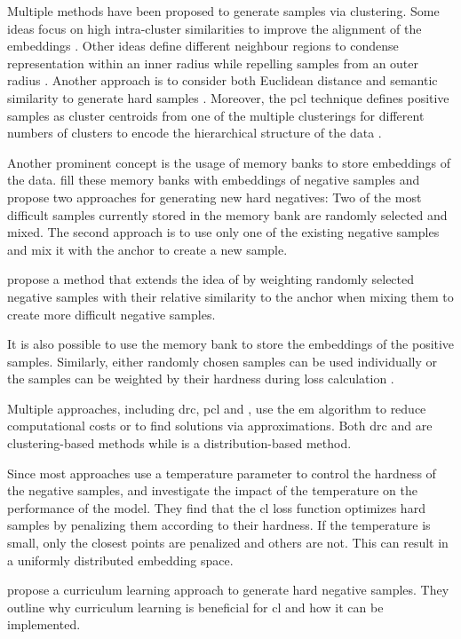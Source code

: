 Multiple methods have been proposed to generate samples via clustering.
Some ideas focus on high intra-cluster similarities to improve the alignment of the embeddings \citet{DRC_2020}.
Other ideas define different neighbour regions to condense representation within an inner radius 
while repelling samples from an outer radius \citet{local_aggr_2019}.
Another approach is to consider both Euclidean distance and semantic similarity to generate hard samples \citet{mining_manifolds_2018}.
Moreover, the \ac{pcl} technique defines positive samples as cluster centroids 
from one of the multiple clusterings for different numbers of clusters 
to encode the hierarchical structure of the data \citet{PCL_2021}.


Another prominent concept is the usage of memory banks to store embeddings of the data.
\citeauthor{mochi_2020} fill these memory banks with embeddings of negative samples 
and propose two approaches for generating new hard negatives: 
Two of the most difficult samples currently stored in the memory bank are randomly selected and mixed.
The second approach is to use only one of the existing negative samples and 
mix it with the anchor to create a new sample.

\citet{progcl_2022} propose a method that extends the idea of \citet{mochi_2020} by weighting randomly selected negative samples 
with their relative similarity to the anchor when mixing them to create more difficult negative samples.

It is also possible to use the memory bank to store the embeddings of the positive samples.
Similarly, either randomly chosen samples can be used individually or 
the samples can be weighted by their hardness during loss calculation \citet{mining_potential_2024}.


Multiple approaches, including \ac{drc}, \ac{pcl} and \progcl{}, use the \ac{em} algorithm 
to reduce computational costs or to find solutions via approximations.
Both \ac{drc} \citet{DRC_2020} and \progcl{} \citet{PCL_2021} are clustering-based methods 
while \progcl{} \citet{progcl_2022} is a distribution-based method.

Since most approaches use a temperature parameter to control the hardness of the negative samples, 
\citet{CL_temp_2021} and \citet{grape_2024} investigate the impact of the temperature on the performance of the model.
They find that the \ac{cl} loss function optimizes hard samples by penalizing them according to their hardness.
If the temperature is small, only the closest points are penalized and others are not.
This can result in a uniformly distributed embedding space.

\citet{curricular_weighting_2024} propose a curriculum learning approach to generate hard negative samples.
They outline why curriculum learning is beneficial for \ac{cl} and how it can be implemented.

